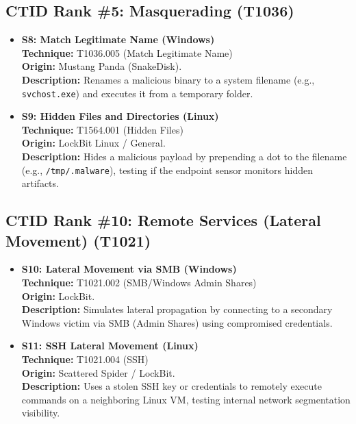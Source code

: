 \subsection{CTID Rank \#5: Masquerading (T1036)}
\begin{itemize}
    \item \textbf{S8: Match Legitimate Name (Windows)} \\
    \textbf{Technique:} T1036.005 (Match Legitimate Name) \\
    \textbf{Origin:} Mustang Panda (SnakeDisk). \\
    \textbf{Description:} Renames a malicious binary to a system filename (e.g., \texttt{svchost.exe}) and executes it from a temporary folder.

    \item \textbf{S9: Hidden Files and Directories (Linux)} \\
    \textbf{Technique:} T1564.001 (Hidden Files) \\
    \textbf{Origin:} LockBit Linux / General. \\
    \textbf{Description:} Hides a malicious payload by prepending a dot to the filename (e.g., \texttt{/tmp/.malware}), testing if the endpoint sensor monitors hidden artifacts.
\end{itemize}

\subsection{CTID Rank \#10: Remote Services (Lateral Movement) (T1021)}
\begin{itemize}
    \item \textbf{S10: Lateral Movement via SMB (Windows)} \\
    \textbf{Technique:} T1021.002 (SMB/Windows Admin Shares) \\
    \textbf{Origin:} LockBit. \\
    \textbf{Description:} Simulates lateral propagation by connecting to a secondary Windows victim via SMB (Admin Shares) using compromised credentials.

    \item \textbf{S11: SSH Lateral Movement (Linux)} \\
    \textbf{Technique:} T1021.004 (SSH) \\
    \textbf{Origin:} Scattered Spider / LockBit. \\
    \textbf{Description:} Uses a stolen SSH key or credentials to remotely execute commands on a neighboring Linux VM, testing internal network segmentation visibility.
\end{itemize}

